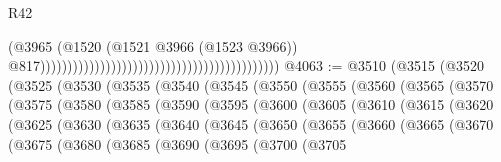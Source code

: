 \begin{lexlean}{R42}
\begin{coremodule}
{                                                                                        (@3965
                                                                                          (@1520
                                                                                            (@1521
                                                                                              @3966
                                                                                              (@1523
                                                                                                @3966))
                                                                                            @817))))))))))))))))))))))))))))))))))))))))))))
@4063 := @3510
    (@3515
      (@3520
        (@3525
          (@3530
            (@3535
              (@3540
                (@3545
                  (@3550
                    (@3555
                      (@3560
                        (@3565
                          (@3570
                            (@3575
                              (@3580
                                (@3585
                                  (@3590
                                    (@3595
                                      (@3600
                                        (@3605
                                          (@3610
                                            (@3615
                                              (@3620
                                                (@3625
                                                  (@3630
                                                    (@3635
                                                      (@3640
                                                        (@3645
                                                          (@3650
                                                            (@3655
                                                              (@3660
                                                                (@3665
                                                                  (@3670
                                                                    (@3675
                                                                      (@3680
                                                                        (@3685
                                                                          (@3690
                                                                            (@3695
                                                                              (@3700
                                                                                (@3705
}
\end{coremodule}
\end{lexlean}

